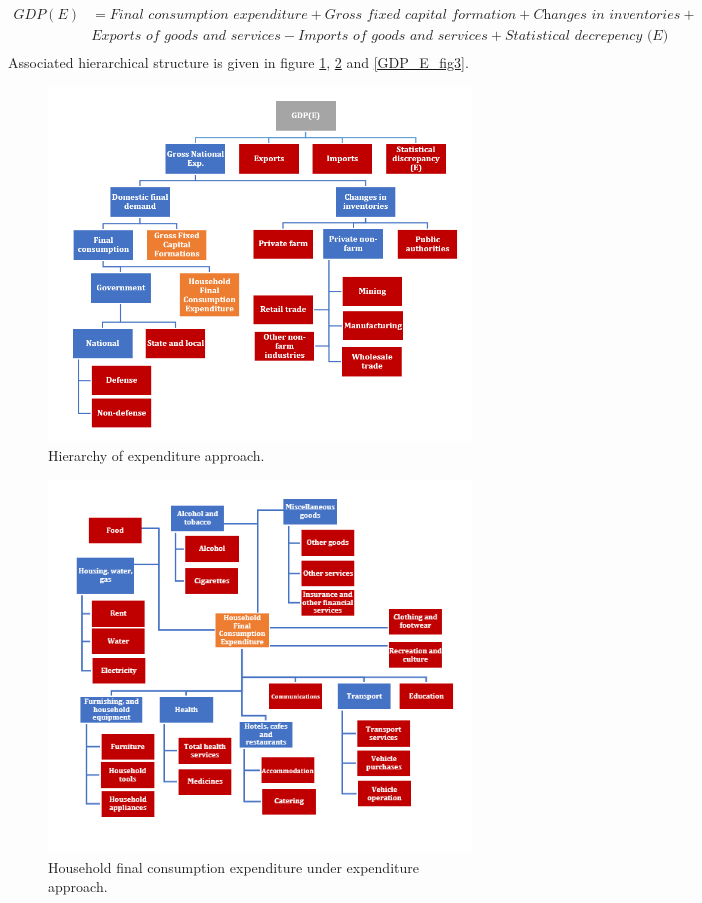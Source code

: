 \documentclass[graybox]{svmult}
\begin{document}
\begin{align*}
GDP(E) &= \textit{Final consumption expenditure} + \textit{Gross fixed capital formation} + \textit{Changes in inventories} +\\ &\textit{Exports of goods and services} - \textit{Imports of goods and services} + \textit{Statistical decrepency (E)}\\
\end{align*}
Associated hierarchical structure is given in figure \ref{GDP_E_fig1}, \ref{GDP_E_fig2} and \ref{GDP_E_fig3}.

\begin{figure}[H]
	\centering
	\small
	\includegraphics[scale=0.65]{Figs/GDP_E_fig1.PNG}
	\caption{Hierarchy of expenditure approach.}\label{GDP_E_fig1}
\end{figure}

\begin{figure}[H]
	\centering
	\small
	\includegraphics[scale=1]{Figs/GDP_E_fig2.PNG}
	\caption{Household final consumption expenditure under expenditure approach.}\label{GDP_E_fig2}
\end{figure}
\end{document}
